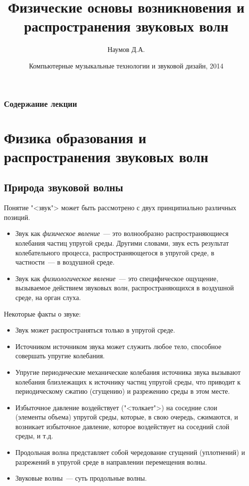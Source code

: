 \documentclass{beamer}
\title[Звуковая волна]{Физические основы возникновения и распространения звуковых волн}
\author{Наумов Д.А.}
\date[09.01.2014] {Компьютерные музыкальные технологии и звуковой дизайн, 2014}
\begin{document}
\begin{frame}
  \titlepage
\end{frame}
  
\begin{frame}
  \frametitle{Содержание лекции}
  \tableofcontents  
\end{frame}
  
\section{Физика образования и распространения звуковых волн}
\subsection{Природа звуковой волны}
\begin{frame}
Понятие "<звук"> может быть рассмотрено с двух принципиально различных позиций.
\begin{itemize}
\item Звук как {\itshape физическое явление}~--- это волнообразно распространяющиеся колебания частиц   упругой среды. Другими словами, звук есть результат колебательного процесса, распространяющегося в упругой среде, в частности~--- в воздушной среде.
\pause
\item Звук как {\itshape физиологическое явление}~--- это специфическое ощущение, вызываемое действием звуковых волн, распространяющихся в воздушной среде, на орган слуха.
\end{itemize}
\end{frame}
\begin{frame}
Некоторые факты о звуке:
\begin{itemize}
\item Звук может распространяться только в упругой среде. 
\pause
\item Источником источником звука может служить любое тело, способное совершать упругие колебания.  
\pause
\item Упругие периодические механические колебания источника звука вызывают колебания близлежащих к источнику частиц упругой среды, что приводит к периодическому сжатию (сгущению) и разрежению среды в этом месте. 
\pause
\item Избыточное давление воздействует ("<толкает">) на соседние слои (элементы объема) упругой среды, которые, в свою очередь, сжимаются, и возникает избыточное давление, которое воздействует на соседний слой среды, и т.д. 
\pause
\item Продольная волна представляет собой чередование сгущений (уплотнений) и разрежений в упругой среде в направлении перемещения волны.
\item Звуковые волны~--- суть продольные волны.
\end{itemize}
\end{frame}   
\end{document}
